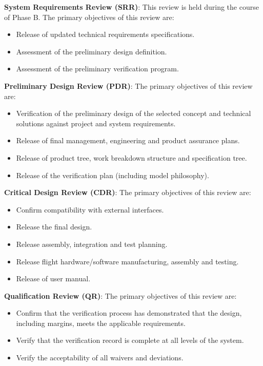 \textbf{System Requirements Review (SRR)}: This review is held during the course of Phase B. The primary objectives of this review are:
\begin{itemize}
\item Release of updated technical requirements specifications.
\item Assessment of the preliminary design definition.
\item Assessment of the preliminary verification program.
\end{itemize}

\textbf{Preliminary Design Review (PDR)}: The primary objectives of this review are:
\begin{itemize}
\item Verification of the preliminary design of the selected concept and technical solutions against project and system requirements.
\item Release of final management, engineering and product assurance plans.
\item Release of product tree, work breakdown structure and specification tree.
\item Release of the verification plan (including model philosophy).
\end{itemize}

\textbf{Critical Design Review (CDR)}: The primary objectives of this review are:
\begin{itemize}
\item Confirm compatibility with external interfaces.
\item Release the final design.
\item Release assembly, integration and test planning.
\item Release flight hardware/software manufacturing, assembly and testing.
\item Release of user manual.
\end{itemize}

\textbf{Qualification Review (QR)}: The primary objectives of this review are:
\begin{itemize}
\item Confirm that the verification process has demonstrated that the design, including margins, meets the applicable requirements.
\item Verify that the verification record is complete at all levels of the system.
\item Verify the acceptability of all waivers and deviations. 
\end{itemize}

